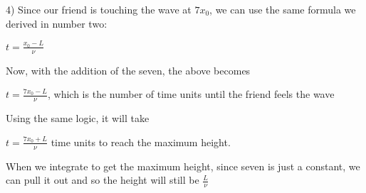 \documentclass[executivepaper]{article}
\begin{document}
\begin{flushleft}

4) Since our friend is touching the wave at $7x_{0}$, we can use the same formula we derived in number two:

\begin{center}

$t=\frac{x_{0}-L}{\nu}$

\end{center}

Now, with the addition of the seven, the above becomes

\begin{center}

$t=\frac{7x_{0}-L}{\nu}$, which is the number of time units until the friend feels the wave

\end{center}

Using the same logic, it will take 

\begin{center}

$t=\frac{7x_{0}+L}{\nu}$ time units to reach the maximum height.

\end{center}

When we integrate to get the maximum height, since seven is just a constant, we can pull it out and so the height will still be $\frac{L}{\nu}$

\end{flushleft}
\end{document}
